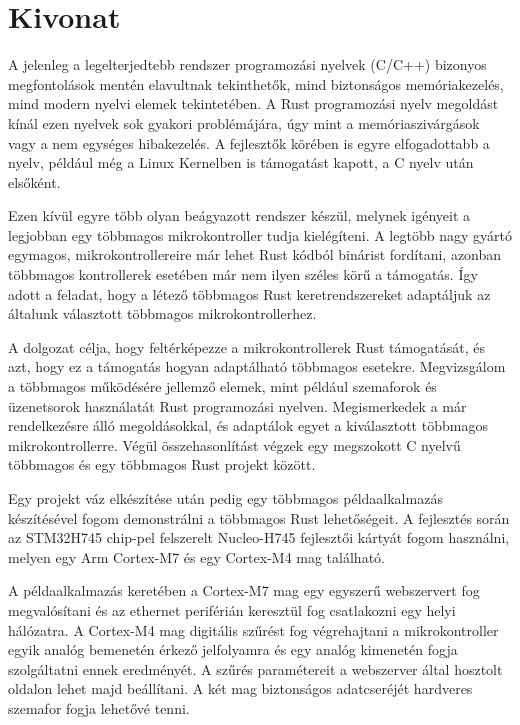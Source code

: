 \setcounter{page}{1}

\selecthungarian

\chapter*{Kivonat}

A jelenleg a legelterjedtebb rendszer programozási nyelvek (C/C++) bizonyos megfontolások mentén elavultnak tekinthetők, mind biztonságos memóriakezelés, mind modern nyelvi elemek tekintetében. A Rust programozási nyelv megoldást kínál ezen nyelvek sok gyakori problémájára, úgy mint a memóriaszivárgások vagy a nem egységes hibakezelés. A fejlesztők körében is egyre elfogadottabb a nyelv, például még a Linux Kernelben is támogatást kapott, a C nyelv után elsőként.\cite{FirstRustCommit}

Ezen kívül egyre több olyan beágyazott rendszer készül, melynek igényeit a legjobban egy többmagos mikrokontroller tudja kielégíteni. A legtöbb nagy gyártó egymagos, mikrokontrollereire már lehet Rust kódból binárist fordítani, azonban többmagos kontrollerek esetében már nem ilyen széles körű a támogatás. Így adott a feladat, hogy a létező többmagos Rust keretrendszereket adaptáljuk az általunk választott többmagos mikrokontrollerhez.

A dolgozat célja, hogy feltérképezze a mikrokontrollerek Rust támogatását, és azt, hogy ez a támogatás hogyan adaptálható többmagos esetekre. Megvizsgálom a többmagos működésére jellemző elemek, mint például szemaforok és üzenetsorok használatát Rust programozási nyelven. Megismerkedek a már rendelkezésre álló megoldásokkal, és adaptálok egyet a kiválasztott többmagos mikrokontrollerre. Végül összehasonlítást végzek egy megszokott C nyelvű többmagos és egy többmagos Rust projekt között.

Egy projekt váz elkészítése után pedig egy többmagos példaalkalmazás készítésével fogom demonstrálni a többmagos Rust lehetőségeit. A fejlesztés során az STM32H745 chip-pel felszerelt Nucleo-H745 fejlesztői kártyát fogom használni, melyen egy Arm Cortex-M7 és egy Cortex-M4 mag található.

A példaalkalmazás keretében a Cortex-M7 mag egy egyszerű webszervert fog megvalósítani és az ethernet periférián keresztül fog csatlakozni egy helyi hálózatra. A Cortex-M4 mag digitális szűrést fog végrehajtani a mikrokontroller egyik analóg bemenetén érkező jelfolyamra és egy analóg kimenetén fogja szolgáltatni ennek eredményét. A szűrés paramétereit a webszerver által hosztolt oldalon lehet majd beállítani. A két mag biztonságos adatcseréjét hardveres szemafor fogja lehetővé tenni.


